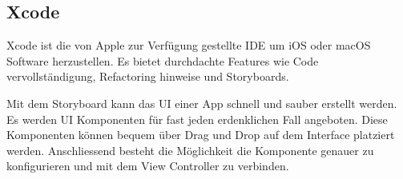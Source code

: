 \subsection{Xcode} \label{sub:xcode}
Xcode ist die von Apple zur Verfügung gestellte IDE um iOS oder macOS Software herzustellen. Es bietet durchdachte Features wie Code vervollständigung, Refactoring hinweise und Storyboards.

Mit dem Storyboard kann das UI einer App schnell und sauber erstellt werden. Es werden UI Komponenten für fast jeden erdenklichen Fall angeboten. Diese Komponenten können bequem über Drag und Drop auf dem Interface platziert werden. Anschliessend besteht die Möglichkeit die Komponente genauer zu konfigurieren und mit dem View Controller zu verbinden.
